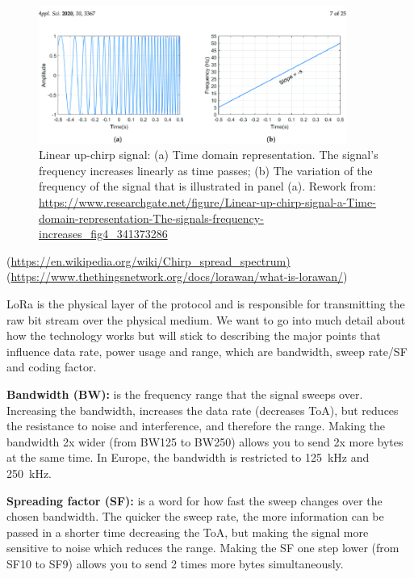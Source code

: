 \begin{figure}[H]
    \centering
    \includegraphics[width=0.9\textwidth]{figures/linear-chirp-up-signal.png}
    \caption{Linear up-chirp signal: (a) Time domain representation. The signal's frequency increases linearly as time passes; (b) The variation of the frequency of the signal that is illustrated in panel (a). Rework from: \url{https://www.researchgate.net/figure/Linear-up-chirp-signal-a-Time-domain-representation-The-signals-frequency-increases_fig4_341373286}}
    \label{fig:LoRa-upchirp}
\end{figure}

(\url{https://en.wikipedia.org/wiki/Chirp_spread_spectrum)}
(\url{https://www.thethingsnetwork.org/docs/lorawan/what-is-lorawan/})

LoRa is the physical layer of the protocol and is responsible for transmitting the raw bit stream over the physical medium.
We want to go into much detail about how the technology works but will stick to describing the major points that influence data rate, power usage and range, which are bandwidth, sweep rate/\ac{SF} and coding factor.

\textbf{Bandwidth (BW):} is the frequency range that the signal sweeps over. Increasing the bandwidth, increases the data rate (decreases \ac{ToA}), but reduces the resistance to noise and interference, and therefore the range. Making the bandwidth 2x wider (from BW125 to BW250) allows you to send 2x more bytes at the same time.
In Europe, the bandwidth is restricted to \SI{125}{\kilo\hertz} and \SI{250}{\kilo\hertz}.

\textbf{Spreading factor (SF):} is a word for how fast the sweep changes over the chosen bandwidth. The quicker the sweep rate, the more information can be passed in a shorter time decreasing the \ac{ToA}, but making the signal more sensitive to noise which reduces the range. Making the \ac{SF} one step lower (from SF10 to SF9) allows you to send 2 times more bytes simultaneously.


